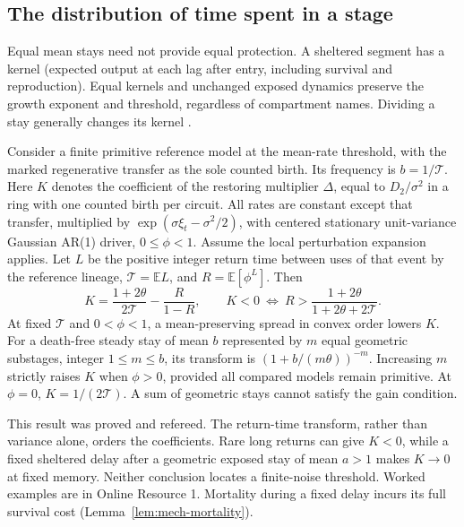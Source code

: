 \subsection{The distribution of time spent in a stage}
Equal mean stays need not provide equal protection. A sheltered segment has a kernel (expected output at each lag after entry, including survival and reproduction). Equal kernels and unchanged exposed dynamics preserve the growth exponent and threshold, regardless of compartment names. Dividing a stay generally changes its kernel \citep{blythe1984,lloyd2001}.

\begin{proposition}\label{prop:mech-renewal}
Consider a finite primitive reference model at the mean-rate threshold, with the marked regenerative transfer as the sole counted birth. Its frequency is \(b=1/\mathcal T\). Here \(K\) denotes the coefficient of the restoring multiplier \(\Delta\), equal to \(D_2/\sigma^2\) in a ring with one counted birth per circuit. All rates are constant except that transfer, multiplied by \(\exp(\sigma\xi_t-\sigma^2/2)\), with centered stationary unit-variance Gaussian AR(1) driver, \(0\leq\phi<1\). Assume the local perturbation expansion applies. Let \(L\) be the positive integer return time between uses of that event by the reference lineage, \(\mathcal T=\mathbb E L\), and \(R=\mathbb E[\phi^L]\). Then
\begin{equation}\label{eq:mech-renewal}
 K=\frac{1+2\theta}{2\mathcal T}-\frac{R}{1-R},\qquad
 K<0\ \Longleftrightarrow\ R>\frac{1+2\theta}{1+2\theta+2\mathcal T}.
\end{equation}
At fixed \(\mathcal T\) and \(0<\phi<1\), a mean-preserving spread in convex order lowers \(K\). For a death-free steady stay of mean \(b\) represented by \(m\) equal geometric substages, integer \(1\leq m\leq b\), its transform is \((1+b/(m\theta))^{-m}\). Increasing \(m\) strictly raises \(K\) when \(\phi>0\), provided all compared models remain primitive. At \(\phi=0\), \(K=1/(2\mathcal T)\). A sum of geometric stays cannot satisfy the gain condition.
\end{proposition}
This result was proved and refereed. The return-time transform, rather than variance alone, orders the coefficients. Rare long returns can give \(K<0\), while a fixed sheltered delay after a geometric exposed stay of mean \(a>1\) makes \(K\to0\) at fixed memory. Neither conclusion locates a finite-noise threshold. Worked examples are in Online Resource 1. Mortality during a fixed delay incurs its full survival cost (Lemma~\ref{lem:mech-mortality}).

